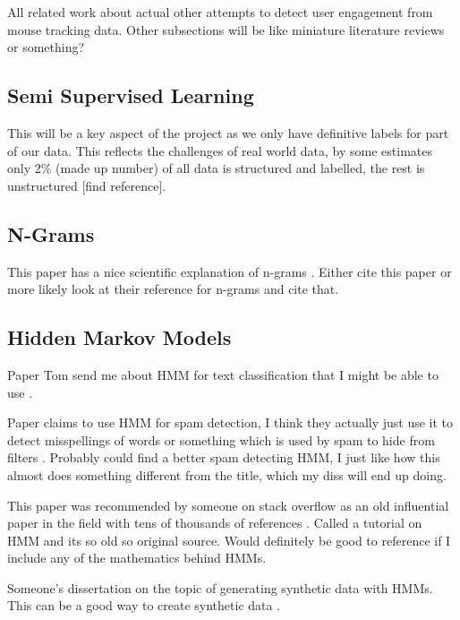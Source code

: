 \documentclass{article}
\begin{document}
All related work about actual other attempts to detect user engagement from mouse tracking data.
Other subsections will be like miniature literature reviews or something?

\subsection{Semi Supervised Learning}
This will be a key aspect of the project as we only have definitive labels for part of our data.
This reflects the challenges of real world data, by some estimates only 2\% (made up number) of all data is structured and labelled, the rest is unstructured [find reference].


\subsection{N-Grams}
This paper has a nice scientific explanation of n-grams \cite{tomovic2006n}.
Either cite this paper or more likely look at their reference for n-grams and cite that.

\subsection{Hidden Markov Models}


Paper Tom send me about HMM for text classification that I might be able to use \cite{collins2016tagging}.

Paper claims to use HMM for spam detection, I think they actually just use it to detect misspellings of words or something which is used by spam to hide from filters \cite{gordillo2007hmm}.
Probably could find a better spam detecting HMM, I just like how this almost does something different from the title, which my diss will end up doing.

This paper was recommended by someone on stack overflow as an old influential paper in the field with tens of thousands of references \cite{rabiner1989tutorial}.
Called a tutorial on HMM and its so old so original source. 
Would definitely be good to reference if I include any of the mathematics behind HMMs. 

Someone's dissertation on the topic of generating synthetic data with HMMs.
This can be a good way to create synthetic data \cite{ferrando2018generating}.
\end{document}
